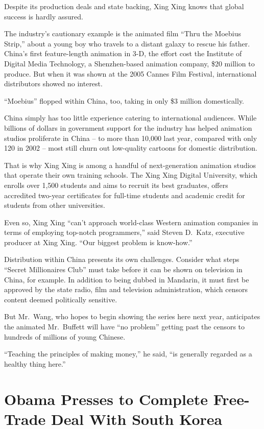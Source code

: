 ﻿\documentclass[12pt]{article}
\begin{document}
Despite its production deals and state backing, Xing Xing knows that global success is hardly
assured.

The industry's cautionary example is the animated film ``Thru the Moebius Strip,'' about a young boy
who travels to a distant galaxy to rescue his father. China's first feature-length animation in 3-D,
the effort cost the Institute of Digital Media Technology, a Shenzhen-based animation company, \$20
million to produce. But when it was shown at the 2005 Cannes Film Festival, international
distributors showed no interest.

``Moebius'' flopped within China, too, taking in only \$3 million domestically.

China simply has too little experience catering to international audiences. While billions of
dollars in government support for the industry has helped animation studios proliferate in China --
to more than 10,000 last year, compared with only 120 in 2002 -- most still churn out low-quality
cartoons for domestic distribution.

That is why Xing Xing is among a handful of next-generation animation studios that operate their own
training schools. The Xing Xing Digital University, which enrolls over 1,500 students and aims to
recruit its best graduates, offers accredited two-year certificates for full-time students and
academic credit for students from other universities.

Even so, Xing Xing ``can't approach world-class Western animation companies in terms of employing
top-notch programmers,'' said Steven D.~Katz, executive producer at Xing Xing. ``Our biggest problem
is know-how.''

Distribution within China presents its own challenges. Consider what steps ``Secret Millionaires
Club'' must take before it can be shown on television in China, for example. In addition to being
dubbed in Mandarin, it must first be approved by the state radio, film and television
administration, which censors content deemed politically sensitive.

But Mr.~Wang, who hopes to begin showing the series here next year, anticipates the animated
Mr.~Buffett will have ``no problem'' getting past the censors to hundreds of millions of young
Chinese.

``Teaching the principles of making money,'' he said, ``is generally regarded as a healthy thing
here.''

\section{Obama Presses to Complete Free-Trade Deal With South Korea}
\end{document}
